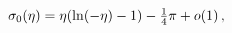 $\mathop{{\sigma_{0}}\/}\nolimits\!\left(\eta\right)=\eta(\mathop{\ln\/}%
\nolimits\!\left(-\eta\right)-1)-\tfrac{1}{4}\pi+\mathop{o\/}\nolimits\!\left(%
1\right),$